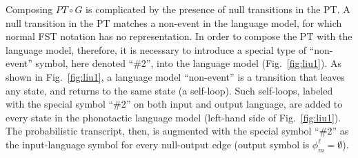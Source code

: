 Composing $PT\circ G$ is complicated by the presence of null
transitions in the PT.  A null transition in the PT matches a
non-event in the language model, for which normal FST notation has no
representation. In order to compose the PT with the language model,
therefore, it is necessary to introduce a special type of
``non-event'' symbol, here denoted ``\#2'', into the language model
(Fig.~\ref{fig:liu1}).  As shown in Fig.~\ref{fig:liu1}, a language
model ``non-event'' is a transition that leaves any state, and returns
to the same state (a self-loop).  Such self-loops, labeled with the
special symbol ``\#2'' on both input and output language, are added to
every state in the phonotactic language model (left-hand side of
Fig.~\ref{fig:liu1}).  The probabilistic transcript, then, is
augmented with the special symbol ``\#2'' as the input-language symbol
for every null-output edge (output symbol is $\phi_m^\ell =\emptyset$).
